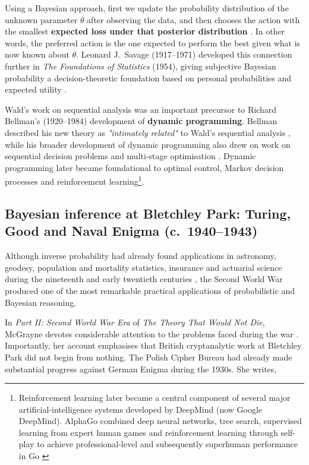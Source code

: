 Using a Bayesian approach, first we update the probability distribution of the unknown parameter $\theta$ after observing the data, and then chooses the action with the smallest \textbf{expected loss under that posterior distribution} \cite{wald1950,savage1954}. In other words, the preferred action is the one expected to perform the best given what is now known about $\theta$. Leonard J.~Savage (1917--1971) developed this connection further in \textit{The Foundations of Statistics} (1954), giving subjective Bayesian probability a decision-theoretic foundation based on personal probabilities and expected utility \cite{savage1954}.

Wald's work on sequential analysis was an important precursor to Richard Bellman's (1920--1984) development of \textbf{dynamic programming}. Bellman described his new theory as \textit{"intimately related"} to Wald's sequential analysis \cite{bellman1952}, while his broader development of dynamic programming also drew on work on sequential decision problems and multi-stage optimisation \cite{bellman1952,bellman1957}. Dynamic programming later became foundational to optimal control, Markov decision processes and reinforcement learning\footnote{Reinforcement learning later became a central component of several major artificial-intelligence systems developed by DeepMind (now Google DeepMind). AlphaGo combined deep neural networks, tree search, supervised learning from expert human games and reinforcement learning through self-play to achieve professional-level and subsequently superhuman performance in Go \cite{silver2016alphago}}.



\subsection{Bayesian inference at Bletchley Park: Turing, Good and Naval Enigma (c.~1940--1943)}
\label{sec:wwii-turing-good}

Although inverse probability had already found applications in astronomy, geodesy, population and mortality statistics, insurance and actuarial science during the nineteenth and early twentieth centuries \cite{mcgrayne2011,hacking1975,franklin2001}, the Second World War produced one of the most remarkable practical applications of probabilistic and Bayesian reasoning.

In \textit{Part II: Second World War Era} of \textit{The Theory That Would Not Die}, McGrayne devotes considerable attention to the problems faced during the war \cite{mcgrayne2011}. Importantly, her account emphasises that British cryptanalytic work at Bletchley Park did not begin from nothing. The Polish Cipher Bureau had already made substantial progress against German Enigma during the 1930s. She writes,

